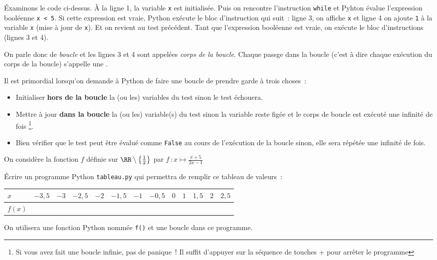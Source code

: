 Éxaminons le code ci-dessus. À la ligne 1, la variable \texttt{x} est initialisée.
Puis on rencontre l'instruction \texttt{while}
et Pyhton évalue l'expression booléenne \texttt{x < 5}. Si cette expression est vraie, Python
exécute le bloc d'instruction qui suit~: ligne 3, on affiche \texttt{x} et ligne 4 on ajoute
\texttt{1} à la variable \texttt{x} (mise à jour de \texttt{x}). Et on revient au test précédent.
Tant que l'expression booléenne est vraie, on exécute le bloc d'instructions (lignes 3 et 4).

On parle donc de \textit{boucle} et les lignes 3 et 4 sont appelées \textit{corps de la boucle}.
Chaque passge dans la boucle (c'est à dire chaque exécution du corps de la boucle) s'appelle
une .
\medskip

Il est primordial lorsqu'on demande à Python de faire une boucle de prendre garde à trois choses~:
\begin{itemize}
\item Initialiser \textbf{hors de la boucle} la (ou les) variables du test sinon le test échouera.
\item Mettre à jour \textbf{dans la boucle} la (ou les) variable(s) du test sinon la variable
reste figée et le corps de boucle est exécuté une infinité de fois
\footnote{Si vous avez fait une boucle infinie, pas de panique~!
Il suffit d'appuyer sur la séquence de touches + pour arrêter le programme}.
\item Bien vérifier que le test peut être évalué comme \texttt{False} au cours de l'exécution
de la boucle sinon, elle sera répétée une infinité de fois.
\end{itemize}


\begin{exercice}\label{python:conditions:exos:tableau}
On considère la fonction $f$ définie sur $\RR\setminus\left\{\frac{1}{2}\right\}$ par
 $f\,: x \longmapsto \frac{x+5}{2x-1}$

Écrire un programme Python \texttt{tableau.py} qui permettra de remplir ce tableau de valeurs~:

\begin{center}
\tabulinesep=1.5mm
\begin{tabu}to0.95
\hline
$x$ & $-3,5$ & $-3$ & $-2,5$ & $-2$ & $-1,5$ & $-1$ & $-0,5$ & $0$ & $1$ & $1,5$ & $2$ & $2,5$ \\
\hline
$f(x)$ & & & & & & & & & & & & \\
\hline
\end{tabu}
\end{center}

On utilisera une fonction Python nommée \texttt{f()} et une boucle dans ce programme.

\end{exercice}

